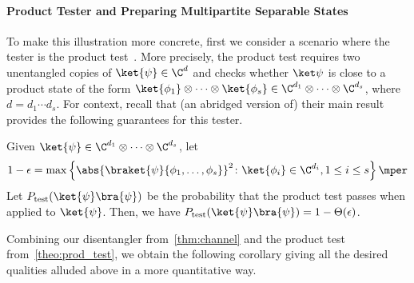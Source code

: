 \paragraph{Product Tester and Preparing Multipartite Separable States}
To make this illustration more concrete, first we consider a  scenario where the tester is the product test~\cite{HM13}. More precisely, the product test requires two unentangled copies of $\ket{\psi} \in \C^d$ and checks whether
$\ket\psi$ is close to a  product state of the form $\ket{\phi_1}\otimes \cdots \otimes \ket{\phi_s} \in \C^{d_1} \otimes \cdots \otimes \C^{d_s}$,
where $d=d_1\cdots d_s$. 
For context, %
recall that (an abridged version of) their main result provides the following guarantees for this tester.

\begin{theorem}\label{theo:prod_test}
  Given $\ket{\psi} \in \C^{d_1} \otimes \cdots \otimes \C^{d_s}$, let
  \[
  1-\epsilon = \max \left\{ \abs{\braket{\psi}{\phi_1,\ldots,\phi_s}}^2 \colon \ket{\phi_i} \in \C^{d_i}, 1 \le i \le s  \right\}\mper
  \]
  Let $P_{\text{test}}(\ket{\psi}\bra{\psi})$ be the probability that the product test passes when applied to $\ket{\psi}$.
  Then, we have $P_{\text{test}}(\ket{\psi}\bra{\psi}) = 1 - \Theta(\epsilon)$.
\end{theorem}

Combining our disentangler from~\cref{thm:channel} and the product test from~\cref{theo:prod_test}, we obtain the
following corollary giving all the desired qualities alluded above in a more quantitative way.

